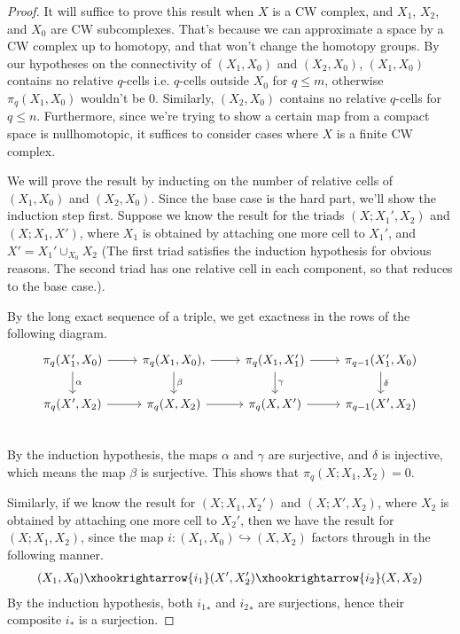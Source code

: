   \begin{proof}
    It will suffice to prove this result when $X$ is a CW complex, and $X_1$, $X_2$, and $X_0$ are
    CW subcomplexes.  That's because we can approximate a space by a CW complex up to homotopy, and
    that won't change the homotopy groups.  By our hypotheses on the connectivity of $(X_1, X_0)$
    and $(X_2, X_0)$, $(X_1, X_0)$ contains no relative $q$-cells i.e. $q$-cells outside $X_0$ for
    $q \leq m$, otherwise $\pi_q(X_1, X_0)$ wouldn't be $0$. Similarly, $(X_2, X_0)$ contains no
    relative $q$-cells for $q \leq n$. Furthermore, since we're trying to show a certain map from a
    compact space is nullhomotopic, it suffices to consider cases where $X$ is a finite CW complex.

    We will prove the result by inducting on the number of relative cells of $(X_1, X_0)$ and
    $(X_2, X_0)$. Since the base case is the hard part, we'll show the induction step first. Suppose
    we know the result for the triads $(X; X_1', X_2)$ and $(X; X_1, X')$, where $X_1$ is obtained
    by attaching one more cell to $X_1'$, and $X' = X_1' \cup_{X_0} X_2$ (The first triad satisfies
    the induction hypothesis for obvious reasons. The second triad has one relative cell in each
    component, so that reduces to the base case.).
     
    By the long exact sequence of a triple, we get exactness in the rows of the following diagram.
    \[
      \begin{tikzcd}
        \pi_q(X_1', X_0) \ar[d, "\alpha"] \ar[r] & \pi_q(X_1, X_0) \ar[d, "\beta"], \ar[r] &
        \pi_q(X_1, X_1') \ar[d, "\gamma"] \ar[r] & \pi_{q-1}(X_1', X_0) \ar[d, "\delta"] \\
        \pi_q(X', X_2) \ar[r] & \pi_q(X, X_2) \ar[r] & \pi_q(X, X') \ar[r] & \pi_{q-1}(X', X_2) \\
      \end{tikzcd}
    \]
    By the induction hypothesis, the maps $\alpha$ and $\gamma$ are surjective, and $\delta$ is
    injective, which means the map $\beta$ is surjective. This shows that $\pi_q(X; X_1, X_2) = 0$.

    Similarly, if we know the result for $(X; X_1, X_2')$ and $(X; X', X_2)$, where $X_2$ is
    obtained by attaching one more cell to $X_2'$, then we have the result for $(X; X_1, X_2)$,
    since the map $i: (X_1, X_0) \hookrightarrow (X, X_2)$ factors through in the following manner.
    \begin{align*}
      (X_1, X_0) \xhookrightarrow{i_1} (X', X_2') \xhookrightarrow{i_2} (X, X_2)
    \end{align*}
    By the induction hypothesis, both ${i_1}_{\ast}$ and ${i_2}_{\ast}$ are surjections, hence their
    composite $i_{\ast}$ is a surjection.


\end{proof}
